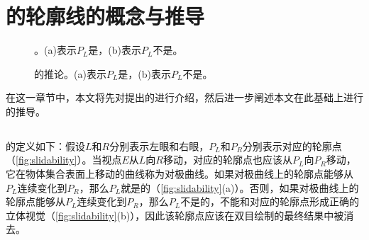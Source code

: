 \chapter{\stc{}的轮廓线的概念与推导}

\begin{figure}[t]
    \centering
    \hfil
    \caption{\epsl{}。(a)表示$P_L$是\epslb{}，(b)表示$P_L$不是\epslb{}。} \label{fig_sim2}
    \label{fig:slidability}
\end{figure}

\begin{figure}[t]
    \centering
    \hfil
    \caption{\epsl{}的推论。(a)表示$P_L$是\epslb{}，(b)表示$P_L$不是\epslb{}。} \label{fig:inverse_slidability}
\end{figure}

在这一章节中，本文将先对\citeauthor{kim2013stereoscopic}提出的\epsl{}\cite{kim2013stereoscopic}进行介绍，然后进一步阐述本文在此基础上进行的推导。

\section{\epsl{}}

\epsl{}的定义如下：假设$L$和$R$分别表示左眼和右眼，$P_L$和$P_R$分别表示对应的轮廓点（\autoref{fig:slidability}）。当视点$E$从$L$向$R$移动，对应的轮廓点也应该从$P_L$向$P_R$移动，它在物体集合表面上移动的曲线称为对极曲线\cite{geiger1995occlusions}。如果对极曲线上的轮廓点能够从$P_L$连续变化到$P_R$，那么$P_L$就是\epslb{}的（\autoref{fig:slidability}(a)）。否则，如果对极曲线上的轮廓点能够从$P_L$连续变化到$P_R$，那么$P_L$不是\epslb{}的，不能和对应的轮廓点形成正确的立体视觉（\autoref{fig:slidability}(b)），因此该轮廓点应该在双目绘制的最终结果中被消去。
 
